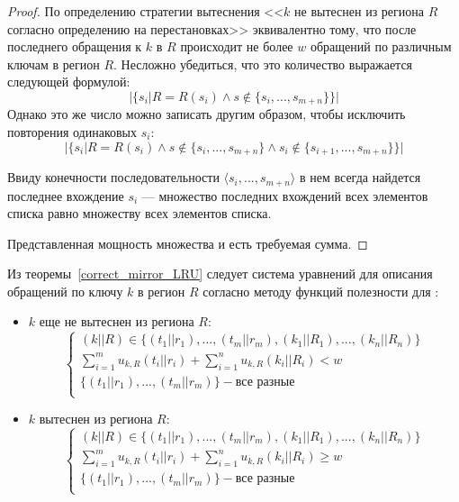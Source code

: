\begin{proof}
По определению стратегии вытеснения \LRU <<$k$ не вытеснен из региона $R$ согласно определению на перестановках>> эквивалентно тому, что после последнего обращения к $k$ в $R$ происходит не более $w$ обращений по различным ключам в регион $R$. Несложно убедиться, что это количество выражается следующей формулой: $$|\{s_i| R = R(s_i) \wedge s \notin \{s_i, ..., s_{m+n}\}\}|$$
Однако это же число можно записать другим образом, чтобы исключить повторения одинаковых $s_i$:
$$|\{s_i| R = R(s_i) \wedge s \notin \{s_i, ..., s_{m+n}\} \wedge s_i \notin \{s_{i+1}, ..., s_{m+n}\}\}|$$

Ввиду конечности последовательности $\langle s_i, ..., s_{m+n}\rangle$ в нем всегда найдется последнее вхождение $s_i$ --- множество последних вхождений всех элементов списка равно множеству всех элементов списка.

Представленная мощность множества и есть требуемая сумма.
\end{proof}

Из теоремы~\ref{correct_mirror_LRU} следует система уравнений для
описания обращений по ключу $k$ в регион $R$ согласно методу функций полезности
для \LRU: \begin{itemize}
\item $k$ еще не вытеснен из региона $R$:
$$
\left\{\begin{array}{l} (k||R) \in \{(t_1||r_1), ..., (t_m||r_m), (k_1||R_1),
..., (k_n||R_n)\}\\
\sum\limits_{i=1}^m u_{k,R}(t_i||r_i) + \sum\limits_{i=1}^n u_{k,R}(k_i||R_i) <
w\\
\{(t_1||r_1), ..., (t_m||r_m)\} - \mbox{все разные}\\
\end{array} \right.
$$
\item $k$ вытеснен из региона $R$:
$$
\left\{\begin{array}{l} (k||R) \in \{(t_1||r_1), ..., (t_m||r_m), (k_1||R_1),
..., (k_n||R_n)\}\\
\sum\limits_{i=1}^m u_{k,R}(t_i||r_i) + \sum\limits_{i=1}^n u_{k,R}(k_i||R_i)
\geqslant w\\
\{(t_1||r_1), ..., (t_m||r_m)\} - \mbox{все разные}\\
\end{array} \right.
$$
\end{itemize}


